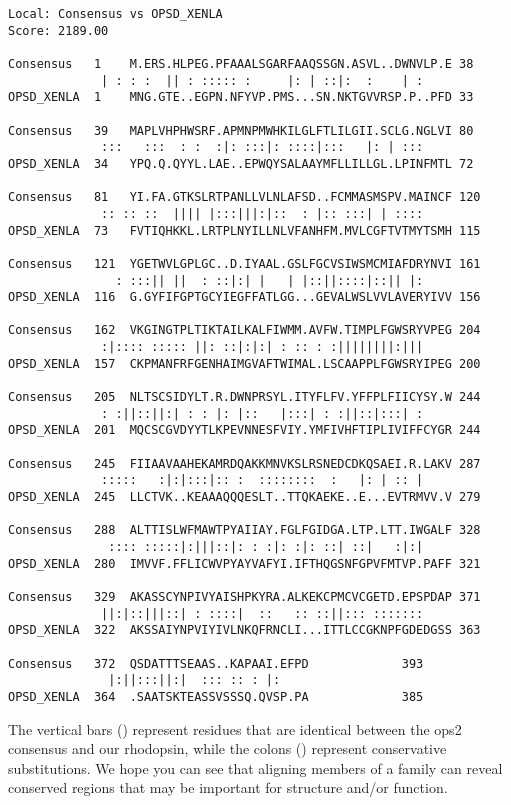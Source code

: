 \documentclass[12pt]{report}
\begin{document}
\unix{}
\begin{verbatim}
Local: Consensus vs OPSD_XENLA
Score: 2189.00

Consensus	1	 M.ERS.HLPEG.PFAAALSGARFAAQSSGN.ASVL..DWNVLP.E 38
			 | : : :  || : ::::: :	   |: |	::|:  :	   | :
OPSD_XENLA	1	 MNG.GTE..EGPN.NFYVP.PMS...SN.NKTGVVRSP.P..PFD 33

Consensus	39	 MAPLVHPHWSRF.APMNPMWHKILGLFTLILGII.SCLG.NGLVI 80
			 :::   :::  : :	 :|: :::|: ::::|:::   |: | :::
OPSD_XENLA	34	 YPQ.Q.QYYL.LAE..EPWQYSALAAYMFLLILLGL.LPINFMTL 72

Consensus	81	 YI.FA.GTKSLRTPANLLVLNLAFSD..FCMMASMSPV.MAINCF 120
			 :: :: ::  ||||	|:::|||:|::  : |:: :::|	| ::::
OPSD_XENLA	73	 FVTIQHKKL.LRTPLNYILLNLVFANHFM.MVLCGFTVTMYTSMH 115

Consensus	121	 YGETWVLGPLGC..D.IYAAL.GSLFGCVSIWSMCMIAFDRYNVI 161
			   : :::|| ||  : ::|:| |   | |::||::::|::|| |:
OPSD_XENLA	116	 G.GYFIFGPTGCYIEGFFATLGG...GEVALWSLVVLAVERYIVV 156

Consensus	162	 VKGINGTPLTIKTAILKALFIWMM.AVFW.TIMPLFGWSRYVPEG 204
			 :|::::	::::: ||: ::|:|:| : :: : :||||||||:|||
OPSD_XENLA	157	 CKPMANFRFGENHAIMGVAFTWIMAL.LSCAAPPLFGWSRYIPEG 200

Consensus	205	 NLTSCSIDYLT.R.DWNPRSYL.ITYFLFV.YFFPLFIICYSY.W 244
			 : :||::||:| : : |: |::	  |:::|	: :||::|:::| :
OPSD_XENLA	201	 MQCSCGVDYYTLKPEVNNESFVIY.YMFIVHFTIPLIVIFFCYGR 244

Consensus	245	 FIIAAVAAHEKAMRDQAKKMNVKSLRSNEDCDKQSAEI.R.LAKV 287
			 :::::	 :|:|:::|:: :  ::::::::	 :   |:	| :: |
OPSD_XENLA	245	 LLCTVK..KEAAAQQQESLT..TTQKAEKE..E...EVTRMVV.V 279

Consensus	288	 ALTTISLWFMAWTPYAIIAY.FGLFGIDGA.LTP.LTT.IWGALF 328
			  :::: :::::|:|||::|: :	:|: :|:	::| ::|	  :|:|
OPSD_XENLA	280	 IMVVF.FFLICWVPYAYVAFYI.IFTHQGSNFGPVFMTVP.PAFF 321

Consensus	329	 AKASSCYNPIVYAISHPKYRA.ALKEKCPMCVCGETD.EPSPDAP 371
			 ||:|::|||::| :	::::|  ::   :: ::||::: :::::::
OPSD_XENLA	322	 AKSSAIYNPVIYIVLNKQFRNCLI...ITTLCCGKNPFGDEDGSS 363

Consensus	372	 QSDATTTSEAAS..KAPAAI.EFPD		       393
			  |:||:::||:|  ::: :: :	|:
OPSD_XENLA	364	 .SAATSKTEASSVSSSQ.QVSP.PA		       385
\end{verbatim}

The vertical bars (\type{|}) represent residues	that are identical
between	the ops2 consensus and our rhodopsin, while the	colons
(\type{:}) represent conservative substitutions. We hope you can see
that aligning members of a family can reveal conserved regions that
may be important for structure and/or function.
\end{document}
